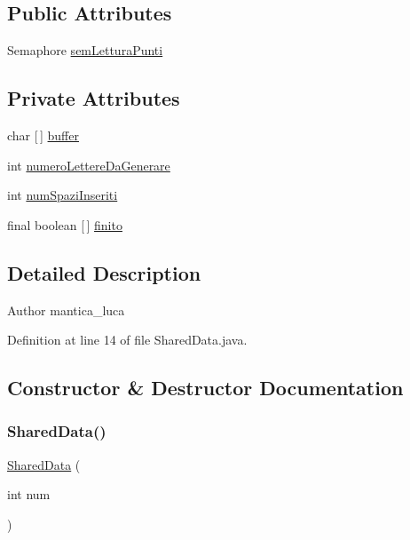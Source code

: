 \subsection*{Public Attributes}
\begin{DoxyCompactItemize}
\item 
Semaphore \mbox{\hyperlink{classmain_1_1_shared_data_a524a290baf668c047ed33ad24d49486b}{sem\+Lettura\+Punti}}
\end{DoxyCompactItemize}
\subsection*{Private Attributes}
\begin{DoxyCompactItemize}
\item 
char \mbox{[}$\,$\mbox{]} \mbox{\hyperlink{classmain_1_1_shared_data_a8317b33b8c004741d95935199d964be9}{buffer}}
\item 
int \mbox{\hyperlink{classmain_1_1_shared_data_a45366d93f9e9d909697e5a38c3449a5c}{numero\+Lettere\+Da\+Generare}}
\item 
int \mbox{\hyperlink{classmain_1_1_shared_data_a06a30a83fd49863012db9229233a62eb}{num\+Spazi\+Inseriti}}
\item 
final boolean \mbox{[}$\,$\mbox{]} \mbox{\hyperlink{classmain_1_1_shared_data_a4c4aa548c3dff981a9d44074eaddc93f}{finito}}
\end{DoxyCompactItemize}


\subsection{Detailed Description}
\begin{DoxyAuthor}{Author}
mantica\+\_\+luca 
\end{DoxyAuthor}


Definition at line 14 of file Shared\+Data.\+java.



\subsection{Constructor \& Destructor Documentation}
\mbox{\label{classmain_1_1_shared_data_a7db3c762818109c4adffd587197cc04c}} 
\subsubsection{\texorpdfstring{Shared\+Data()}{SharedData()}}
{\footnotesize\ttfamily \mbox{\hyperlink{classmain_1_1_shared_data}{Shared\+Data}} (\begin{DoxyParamCaption}\item[{int}]{num }\end{DoxyParamCaption})}



